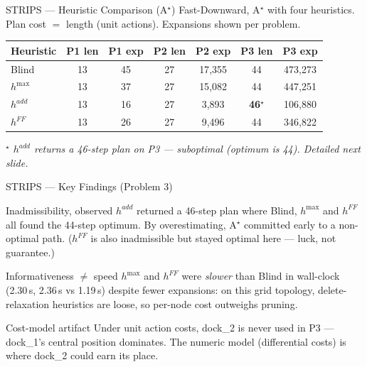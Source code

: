 \documentclass{beamer}
\begin{document}
\begin{frame}{STRIPS --- Heuristic Comparison (A$^\star$)}
Fast-Downward, A$^\star$ with four heuristics. Plan cost $=$ length (unit
actions). Expansions shown per problem.

\vspace{0.6em}
\begin{center}
\small
\begin{tabular}{lcccccc}
\toprule
\textbf{Heuristic} & \textbf{P1 len} & \textbf{P1 exp} & \textbf{P2 len} & \textbf{P2 exp} & \textbf{P3 len} & \textbf{P3 exp}\\
\midrule
Blind          & 13 & 45 & 27 & 17{,}355 & 44 & 473{,}273\\
$h^{\max}$     & 13 & 37 & 27 & 15{,}082 & 44 & 447{,}251\\
$h^{add}$      & 13 & 16 & 27 & 3{,}893  & \textcolor{maincolor}{\textbf{46$^\star$}} & 106{,}880\\
$h^{FF}$       & 13 & 26 & 27 & 9{,}496  & 44 & 346{,}822\\
\bottomrule
\end{tabular}
\end{center}

\vspace{0.5em}
{\small\itshape\color{maincolor}$^\star$ $h^{add}$ returns a 46-step plan on
P3 --- suboptimal (optimum is 44). Detailed next slide.}
\end{frame}

\begin{frame}{STRIPS --- Key Findings (Problem 3)}
\small
\begin{block}{Inadmissibility, observed}
$h^{add}$ returned a 46-step plan where Blind, $h^{\max}$ and $h^{FF}$ all
found the 44-step optimum. By overestimating, A$^\star$ committed early to a
non-optimal path. ($h^{FF}$ is also inadmissible but stayed optimal here ---
luck, not guarantee.)
\end{block}
\vspace{-0.5em}
\begin{block}{Informativeness $\neq$ speed}
$h^{\max}$ and $h^{FF}$ were \emph{slower} than Blind in wall-clock (2.30\,s,
2.36\,s vs 1.19\,s) despite fewer expansions: on this grid topology,
delete-relaxation heuristics are loose, so per-node cost outweighs pruning.
\end{block}
\begin{block}{Cost-model artifact}
Under unit action costs, dock\_2 is never used in P3 --- dock\_1's central
position dominates. The numeric model (differential costs) is where dock\_2
could earn its place.
\end{block}
\end{frame}
\end{document}
